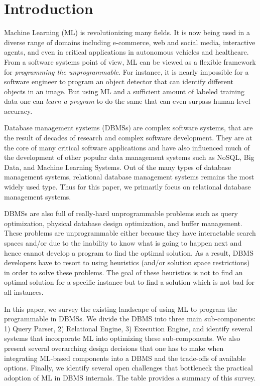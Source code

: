 \section{Introduction}

Machine Learning (ML) is revolutionizing many fields.
It is now being used in a diverse range of domains including e-commerce, web and social media, interactive agents, and even in critical applications in autonomous vehicles and healthcare.
From a software systems point of view, ML can be viewed as a flexible framework for \textit{programming the unprogrammable}.
For instance, it is nearly impossible for a software engineer to program an object detector that can identify different objects in an image.
But using ML and a sufficient amount of labeled training data one can \textit{learn a program} to do the same that can even surpass human-level accuracy.

Database management systems (DBMSs) are complex software systems, that are the result of decades of research and complex software development.
They are at the core of many critical software applications and have also influenced much of the development of other popular data management systems such as NoSQL, Big Data, and Machine Learning Systems.
Out of the many types of database management systems, relational database management systems remains the most widely used type.
Thus for this paper, we primarily focus on relational database management systems.

DBMSs are also full of really-hard unprogrammable problems such as query optimization, physical database design optimization, and buffer management.
These problems are unprogrammable either because they have interactable search spaces and/or due to the inability to know what is going to happen next and hence cannot develop a program to find the optimal solution.
As a result, DBMS developers have to resort to using heuristics (and/or solution space restrictions) in order to solve these problems.
The goal of these heuristics is not to find an optimal solution for a specific instance but to find a solution which is not bad for all instances.

In this paper, we survey the existing landscape of using ML to program the programmable in DBMSs. 
We divide the DBMS into three main sub-components: 1) Query Parser, 2) Relational Engine, 3) Execution Engine, and identify several systems that incorporate ML into optimizing these sub-components. 
We also present several overarching design decisions that one has to make when integrating ML-based components into a DBMS and the trade-offs of available options.
Finally, we identify several open challenges that bottleneck the practical adoption of ML in DBMS internals.
The table provides a summary of this survey.

